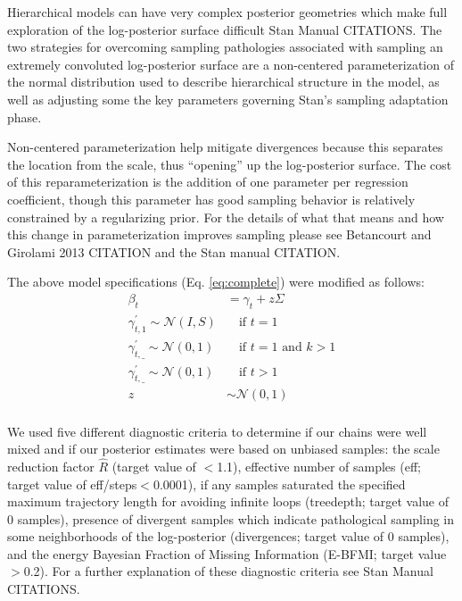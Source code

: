 \documentclass[12pt,letterpaper]{article}
\begin{document}
Hierarchical models can have very complex posterior geometries which make full exploration of the log-posterior surface difficult Stan Manual CITATIONS. The two strategies for overcoming sampling pathologies associated with sampling an extremely convoluted log-posterior surface are a non-centered parameterization of the normal distribution used to describe hierarchical structure in the model, as well as adjusting some the key parameters governing Stan's sampling adaptation phase.

Non-centered parameterization help mitigate divergences because this separates the location from the scale, thus ``opening'' up the log-posterior surface. The cost of this reparameterization is the addition of one parameter per regression coefficient, though this parameter has good sampling behavior is relatively constrained by a regularizing prior. For the details of what that means and how this change in parameterization improves sampling please see Betancourt and Girolami 2013 CITATION and the Stan manual CITATION.

The above model specifications (Eq. \ref{eq:complete}) were modified as follows:
\begin{equation}
  \begin{aligned}
    \beta_{t} &= \gamma_{t} + z\Sigma \\
    \gamma^{'}_{t, 1} \sim \mathcal{N}(I, S) & \quad \text{if } t = 1 \\
    \gamma^{'}_{t, \_} \sim \mathcal{N}(0, 1) & \quad \text{if } t = 1 \text{ and } k > 1 \\
    \gamma^{'}_{t, \_} \sim \mathcal{N}(0, 1) & \quad \text{if } t > 1 \\
    z &\sim \mathcal{N}(0, 1) \\
  \end{aligned}
\end{equation}


We used five different diagnostic criteria to determine if our chains were well mixed and if our posterior estimates were based on unbiased samples: the scale reduction factor \(\hat{R}\) (target value of \(<\)1.1), effective number of samples (eff; target value of eff/steps\(<\)0.0001), if any samples saturated the specified maximum trajectory length for avoiding infinite loops (treedepth; target value of 0 samples), presence of divergent samples which indicate pathological sampling in some neighborhoods of the log-posterior (divergences; target value of 0 samples), and the energy Bayesian Fraction of Missing Information (E-BFMI; target value \(>\)0.2). For a further explanation of these diagnostic criteria see Stan Manual CITATIONS.
\end{document}

